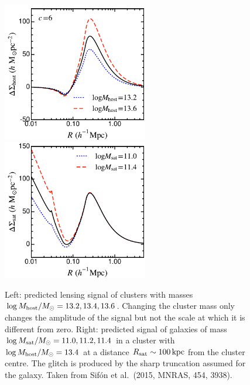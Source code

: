 \documentclass[12pt]{article}
\begin{document}
\pagebreak

\begin{figure}
 \centerline{\includegraphics[width=2.5in]{ESDhost_bin1_cfix.pdf}
             \includegraphics[width=2.5in]{ESDsat_bin1_msat.pdf}}
\caption{\small Left: predicted lensing signal of clusters with masses $\log M_{\rm host}/M_\odot=13.2,13.4,13.6$. Changing the cluster mass only changes the amplitude of the signal but not the scale at which it is different from zero. Right: predicted signal of galaxies of mass $\log M_{\rm sat}/M_\odot=11.0,11.2,11.4$ in a cluster with $\log M_{\rm host}/M_\odot=13.4$ at a distance $R_{\rm sat}\sim100\,{\rm kpc}$ from the cluster centre. The glitch is produced by the sharp truncation assumed for the galaxy. Taken from Sif\'on et al.\ (2015, MNRAS, 454, 3938).}
\end{figure}
\end{document}
